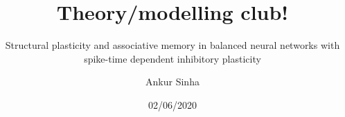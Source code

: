 
\usepackage{color}
\usepackage{tipa}
\usepackage[scale=2]{ccicons}
\usepackage{amssymb}
\usepackage{tikz}
\usetikzlibrary{mindmap, arrows.meta, positioning, arrows}
\usepackage{pgfplots}
\usepackage{jneurosci}
\usepackage{subcaption}
\usepackage[T1]{fontenc}
\usepackage[utf8]{inputenc}
\usepackage[style=nature,backend=biber,autocite=footnote]{biblatex}

\renewcommand*{\bibfont}{\tiny}
\usepackage[sfdefault]{roboto}
\usepackage[normalem]{ulem}
\usepackage{hyperref}
\hypersetup{colorlinks,linkcolor=Green,urlcolor=links}
\usepackage{graphicx}
\usepackage{algorithmic}
\usepackage{textcomp}
\usepackage{wrapfig}
\usepackage{textgreek}
\usepackage{euler}
\usepackage{csquotes}
\usepackage{tabularx}
\usepackage{booktabs}


\renewcommand{\footnoterule}{}

\title{Theory/modelling club!}
\subtitle{Structural plasticity and associative memory in balanced neural networks with spike-time dependent inhibitory plasticity}
\author[Ankur Sinha]{Ankur Sinha}
\date{02/06/2020}




\begin{frame}
  \titlepage{}
\end{frame}


